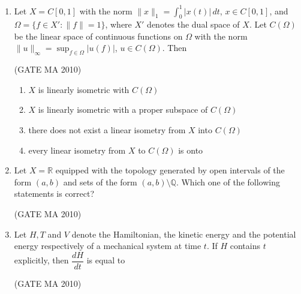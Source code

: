 \documentclass[journal,12pt,onecolumn]{IEEEtran}
\theoremstyle{remark}
\begin{document}
\begin{flushleft}
\begin{enumerate}
\item Let $X=C[0,1]$ with the norm $\lVert x\rVert_1=\displaystyle\int_{0}^{1}\lvert x(t)\rvert\,dt$, $x\in C[0,1]$, and $\Omega=\{f\in X' \colon \lVert f\rVert=1\}$, where $X'$ denotes the dual space of $X$. Let $C(\Omega)$ be the linear space of continuous functions on $\Omega$ with the norm $\lVert u\rVert_\infty=\sup_{f\in\Omega}\lvert u(f)\rvert$, $u\in C(\Omega)$. Then \underline{\hspace{2cm}}

\hfill(GATE MA 2010)

\begin{enumerate}
\item $X$ is linearly isometric with $C(\Omega)$
\item $X$ is linearly isometric with a proper subspace of $C(\Omega)$
\item there does not exist a linear isometry from $X$ into $C(\Omega)$
\item every linear isometry from $X$ to $C(\Omega)$ is onto
\end{enumerate}

\item Let $X=\mathbb{R}$ equipped with the topology generated by open intervals of the form $(a,b)$ and sets of the form $(a,b)\setminus\mathbb{Q}$. Which one of the following statements is correct? \underline{\hspace{2cm}}

\hfill(GATE MA 2010)

\begin{enumerate}
\end{enumerate}

\item Let $H,T$ and $V$ denote the Hamiltonian, the kinetic energy and the potential energy respectively of a mechanical system at time $t$. If $H$ contains $t$ explicitly, then $\dfrac{dH}{dt}$ is equal to \underline{\hspace{2cm}}

\hfill(GATE MA 2010)

\begin{enumerate}
\end{enumerate}


\end{enumerate}
\end{flushleft}
\end{document}
